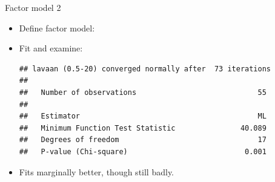 \begin{frame}[fragile]{Factor model 2}
  
  
  \begin{itemize}
  \item Define factor model:

\begin{knitrout}
\color{fgcolor}\begin{kframe}
\begin{alltt}
\hlkwb{=}
\end{alltt}
\end{kframe}
\end{knitrout}

\item Fit and examine:

{\small  

\begin{knitrout}
\color{fgcolor}\begin{kframe}
\begin{alltt}
\hlkwb{=}\hlstd{=track[,}\hlopt{-}\hlstd{],}
\end{alltt}
\begin{verbatim}
## lavaan (0.5-20) converged normally after  73 iterations
## 
##   Number of observations                            55
## 
##   Estimator                                         ML
##   Minimum Function Test Statistic               40.089
##   Degrees of freedom                                17
##   P-value (Chi-square)                           0.001
\end{verbatim}
\end{kframe}
\end{knitrout}
}

\item Fits  marginally better, though still badly.
  

  \end{itemize}

  
\end{frame}

